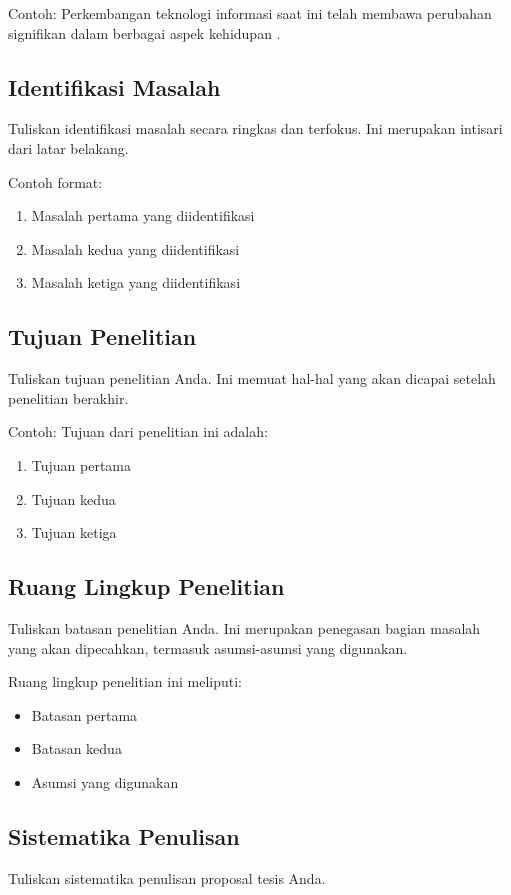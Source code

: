 \documentclass[12pt,a4paper]{article}
\begin{document}
Contoh: Perkembangan teknologi informasi saat ini telah membawa perubahan signifikan dalam berbagai aspek kehidupan \cite{contoh2023}.

\subsection{Identifikasi Masalah}
Tuliskan identifikasi masalah secara ringkas dan terfokus. Ini merupakan intisari dari latar belakang.

Contoh format:
\begin{enumerate}
    \item Masalah pertama yang diidentifikasi
    \item Masalah kedua yang diidentifikasi
    \item Masalah ketiga yang diidentifikasi
\end{enumerate}

\subsection{Tujuan Penelitian}
Tuliskan tujuan penelitian Anda. Ini memuat hal-hal yang akan dicapai setelah penelitian berakhir.

Contoh:
Tujuan dari penelitian ini adalah:
\begin{enumerate}
    \item Tujuan pertama
    \item Tujuan kedua
    \item Tujuan ketiga
\end{enumerate}

\subsection{Ruang Lingkup Penelitian}
Tuliskan batasan penelitian Anda. Ini merupakan penegasan bagian masalah yang akan dipecahkan, termasuk asumsi-asumsi yang digunakan.

Ruang lingkup penelitian ini meliputi:
\begin{itemize}
    \item Batasan pertama
    \item Batasan kedua
    \item Asumsi yang digunakan
\end{itemize}

\subsection{Sistematika Penulisan}
Tuliskan sistematika penulisan proposal tesis Anda.
\end{document}
